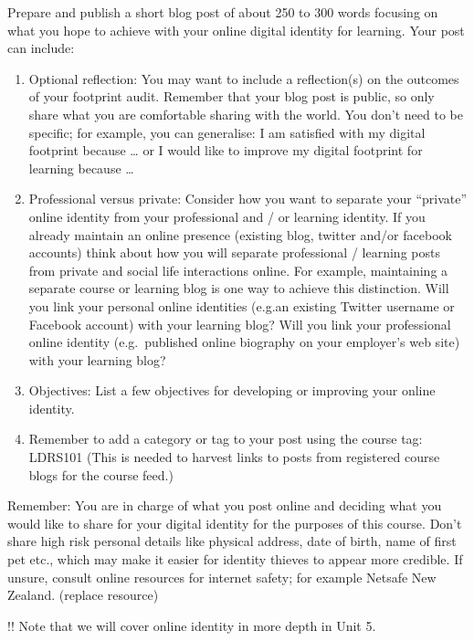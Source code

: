 \documentclass[
]{book}
\theoremstyle{definition}
\theoremstyle{definition}
\theoremstyle{definition}
\theoremstyle{definition}
\theoremstyle{remark}
\begin{document}
\begin{reflect}
Prepare and publish a short blog post of about 250 to 300 words focusing on what you hope to achieve with your online digital identity for learning. Your post can include:

\begin{enumerate}
\def\labelenumi{\arabic{enumi}.}
\item
  Optional reflection: You may want to include a reflection(s) on the outcomes of your footprint audit. Remember that your blog post is public, so only share what you are comfortable sharing with the world. You don't need to be specific; for example, you can generalise: I am satisfied with my digital footprint because \ldots{} or I would like to improve my digital footprint for learning because \ldots{}
\item
  Professional versus private: Consider how you want to separate your ``private'' online identity from your professional and / or learning identity. If you already maintain an online presence (existing blog, twitter and/or facebook accounts) think about how you will separate professional / learning posts from private and social life interactions online. For example, maintaining a separate course or learning blog is one way to achieve this distinction. Will you link your personal online identities (e.g.an existing Twitter username or Facebook account) with your learning blog? Will you link your professional online identity (e.g.~published online biography on your employer's web site) with your learning blog?
\item
  Objectives: List a few objectives for developing or improving your online identity.
\item
  Remember to add a category or tag to your post using the course tag: LDRS101 (This is needed to harvest links to posts from registered course blogs for the course feed.)
\end{enumerate}

Remember: You are in charge of what you post online and deciding what you would like to share for your digital identity for the purposes of this course. Don't share high risk personal details like physical address, date of birth, name of first pet etc., which may make it easier for identity thieves to appear more credible. If unsure, consult online resources for internet safety; for example Netsafe New Zealand. (replace resource)

!! Note that we will cover online identity in more depth in Unit 5.
\end{reflect}
\end{document}
